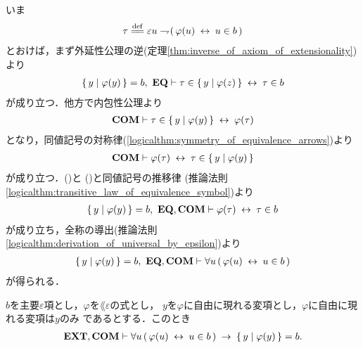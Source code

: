 	\begin{sketch}
		いま
		\begin{align}
			\tau \defeq \varepsilon u \negation (\, \varphi(u) \lrarrow u \in b\, )
		\end{align}
		とおけば，まず外延性公理の逆(定理\ref{thm:inverse_of_axiom_of_extensionality})より
		\begin{align}
			\left\{\, y \mid \varphi(y)\, \right\} = b,\ \mbox{{\bf EQ}} \vdash 
			\tau \in \left\{\, y \mid \varphi(z)\, \right\} \hspace{0.25em}\leftrightarrow\hspace{0.25em} \tau \in b
			\label{fom:equivalent_formula_rewriting_3_1}
		\end{align}
		が成り立つ．他方で内包性公理より
		\begin{align}
			\mbox{\bf COM} \vdash \tau \in \left\{\, y \mid \varphi(y)\, \right\} \hspace{0.25em}\leftrightarrow\hspace{0.25em} \varphi(\tau)
		\end{align}
		となり，同値記号の対称律(\ref{logicalthm:symmetry_of_equivalence_arrows})より
		\begin{align}
			\mbox{\bf COM} \vdash \varphi(\tau) \hspace{0.25em}\leftrightarrow\hspace{0.25em} \tau \in \left\{\, y \mid \varphi(y)\, \right\}
			\label{fom:equivalent_formula_rewriting_3_2}
		\end{align}
		が成り立つ．()と
		()と同値記号の推移律
		(推論法則\ref{logicalthm:transitive_law_of_equivalence_symbol})より
		\begin{align}
			\left\{\, y \mid \varphi(y)\, \right\} = b,\ \mbox{{\bf EQ}},\mbox{\bf COM} \vdash 
			\varphi(\tau) \hspace{0.25em}\leftrightarrow\hspace{0.25em} \tau \in b 
		\end{align}
		が成り立ち，全称の導出(推論法則\ref{logicalthm:derivation_of_universal_by_epsilon})より
		\begin{align}
			\left\{\, y \mid \varphi(y)\, \right\} = b,\ \mbox{{\bf EQ}},\mbox{\bf COM} \vdash 
			\forall u\, (\, \varphi(u) \hspace{0.25em}\leftrightarrow\hspace{0.25em} u \in b\, )
		\end{align}
		が得られる．
		\QED
	\end{sketch}
	
	\begin{screen}
		\begin{thm}
		\label{thm:equivalent_formula_rewriting_4}
			$b$を主要$\varepsilon$項とし，$\varphi$を$\lang{\varepsilon}$の式とし，
			$y$を$\varphi$に自由に現れる変項とし，$\varphi$に自由に現れる変項は$y$のみ
			であるとする．このとき
			\begin{align}
				\mbox{{\bf EXT}},\mbox{\bf COM} \vdash \forall u\, (\, \varphi(u) \hspace{0.25em}\leftrightarrow\hspace{0.25em} u \in b\, )
				\hspace{0.25em}\rightarrow\hspace{0.25em} \left\{\, y \mid \varphi(y)\, \right\} = b.
			\end{align}
		\end{thm}
	\end{screen}
	

